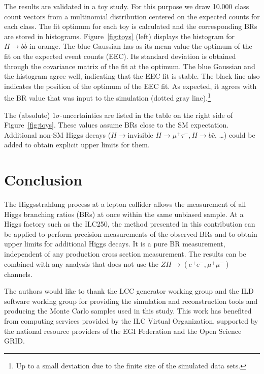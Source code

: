 \documentclass[a4paper,11pt]{article}
\begin{document}
The results are validated in a toy study.
For this purpose we draw 10.000 class count vectors from a multinomial distribution
centered on the expected counts for each class.
The fit optimum for each toy is calculated and the corresponding BRs are stored
in histograms.
Figure~\ref{fig:toys} (left) displays the histogram for $H \to b \bar{b}$ in orange.
The blue Gaussian has as its mean value the optimum of the fit on the
expected event counts (EEC).
Its standard deviation is obtained through the covariance matrix of the fit
at the optimum.
The blue Gaussian and the histogram agree well, indicating that the EEC fit is stable.
The black line also indicates the position of the optimum of the EEC fit.
As expected, it agrees with the BR value that was
input to the simulation (dotted gray line).\footnote{
    Up to a small deviation due to the finite size of the simulated data sets.
}

The (absolute) $1 \sigma$-uncertainties are listed in the table on the right side
of Figure~\ref{fig:toys}.
These values assume BRs close to the SM expectation.
Additional non-SM Higgs decays
($H \to \textrm{invisible}$ $H \to \mu^+\tau^-, H \to b\bar{c}$, \ldots)
could be added to obtain explicit upper limits for them.


\section{Conclusion}\label{sec:conclusion}
The Higgsstrahlung process at a lepton collider allows the measurement of
all Higgs branching ratios (BRs) at once within the same unbiased sample.
At a Higgs factory such as the ILC250, the method presented in this contribution
can be applied to perform precision measurements of the observed BRs
and to obtain upper limits for additional Higgs decays.
It is a pure BR measurement, independent of any production cross section measurement.
The results can be combined with any analysis that does not use the
$ZH \to \left( e^+ e^-, \mu^+ \mu^- \right)$ channels.

\acknowledgments
The authors would like to thank the LCC generator working group and the ILD software working
group for providing the simulation and reconstruction tools and producing the Monte Carlo
samples used in this study. This work has benefited from computing services provided by
the ILC Virtual Organization, supported by the national resource providers of the EGI
Federation and the Open Science GRID.



\end{document}
